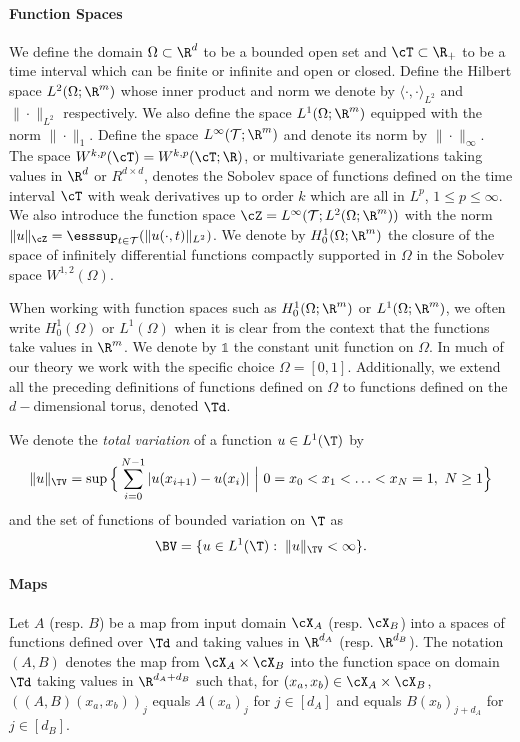 \documentclass[letterpaper,11pt]{article}
\begin{document}
\paragraph{Function Spaces}
We define the domain $\Omega \subset \R^d$ to be a bounded open set and $\cT \subset \R_+$ to be a time interval which can be finite or infinite and open or closed.  Define the Hilbert space $L^2(\Omega; \R^m)$ whose inner product and norm we denote by $\langle \cdot, \cdot\rangle_{L^2}$ and $\|\cdot\|_{L^2}$ respectively. We also define the space $L^1(\Omega; \R^m)$ equipped with the norm $\|\cdot\|_1$. Define the space $L^\infty(\mathcal{T};\R^m)$ and denote its norm by $\|\cdot\|_\infty$. The space 
$W^{k, p}(\cT)=W^{k, p}(\cT;\R)$, or multivariate generalizations taking values in $\R^d$ or $R^{d \times d}$, denotes the Sobolev space of functions defined on the time interval $\cT$ with weak derivatives up to order $k$ which are all in $L^p$, $1\leq p \leq \infty$. We also introduce the function space $\cZ = L^\infty(\mathcal{T}; L^2(\Omega; \R^m))$ with the norm $\|u\|_\cZ = \esssup_{t \in \mathcal{T}}(\|u(\cdot, t)\|_{L^2})$. We denote by $H_0^1(\Omega; \R^m)$ the closure of the space of infinitely differential functions compactly supported in $\Omega$ in the Sobolev space $W^{1,2}(\Omega)$.

When working with function spaces such as $H_0^1(\Omega; \R^m)$ or $L^1(\Omega; \R^m)$, we often write $H_0^1(\Omega)$ or $L^1(\Omega)$ when it is clear from the context that the functions take values in $\R^m$.
We denote by $\mathds{1}$ the constant unit function on $\Omega$. In much of our theory we work with the specific choice $\Omega = [0, 1]$. Additionally, we extend all the preceding definitions of functions defined
on $\Omega$ to functions defined on the $d-$dimensional torus, denoted $\Td$.

We denote the \textit{total variation} of a function $u \in L^1(\T)$ by 
\begin{equation*}\label{eq:tv_norm}
    \|u\|_{\TV} = \sup\Big\{\sum_{i=0}^{N-1}|u(x_{i+1}) - u(x_i)| \ \Big| \ 0 = x_0 < x_1 < \hdots < x_{N} = 1, \ N \geq 1\Big\}
\end{equation*}
and the set of functions of bounded variation on $\T$ as 
\begin{equation}
    \BV = \{u \in L^1(\T): \; \|u\|_{\TV} < \infty\}.
\end{equation}




\paragraph{Maps}
Let $A$ (resp. $B$) be a map from input domain $\cX_A$ (resp. $\cX_B$)
into a spaces of functions defined over $\Td$ and taking values in $\R^{d_A}$ (resp. $\R^{d_B}$). The notation $(A, B)$ denotes the map from $\cX_A \times \cX_B$ into 
the function space on domain $\Td$ taking values in $\R^{d_A + d_B}$ such that, for $(x_a, x_b) \in \cX_A \times \cX_B$, $((A,B)(x_a,x_b))_j$ equals $A(x_a)_j$ for $j \in [d_A]$ and equals $B(x_b)_{j+d_A}$ for $j \in [d_B]$.
\end{document}
